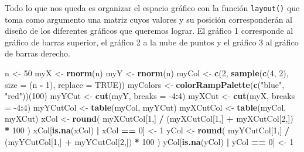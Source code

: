 \documentclass[
]{book}
\newenvironment{Shaded}{\begin{snugshade}}{\end{snugshade}}
\newcommand{\DataTypeTok}[1]{\textcolor[rgb]{0.13,0.29,0.53}{#1}}
\newcommand{\DecValTok}[1]{\textcolor[rgb]{0.00,0.00,0.81}{#1}}
\newcommand{\KeywordTok}[1]{\textcolor[rgb]{0.13,0.29,0.53}{\textbf{#1}}}
\newcommand{\NormalTok}[1]{#1}
\newcommand{\OperatorTok}[1]{\textcolor[rgb]{0.81,0.36,0.00}{\textbf{#1}}}
\newcommand{\OtherTok}[1]{\textcolor[rgb]{0.56,0.35,0.01}{#1}}
\newcommand{\StringTok}[1]{\textcolor[rgb]{0.31,0.60,0.02}{#1}}
\begin{document}
Todo lo que nos queda es organizar el espacio gráfico con la función \texttt{layout()} que toma como argumento una matriz cuyos valores y su posición corresponderán al diseño de los diferentes gráficos que queremos lograr. El gráfico 1 corresponde al gráfico de barras superior, el gráfico 2 a la nube de puntos y el gráfico 3 al gráfico de barras derecho.

\begin{Shaded}
\begin{Highlighting}[]
\NormalTok{n <-}\StringTok{ }\DecValTok{50}
\NormalTok{myX <-}\StringTok{ }\KeywordTok{rnorm}\NormalTok{(n)}
\NormalTok{myY <-}\StringTok{ }\KeywordTok{rnorm}\NormalTok{(n)}
\NormalTok{myCol <-}\StringTok{ }\KeywordTok{c}\NormalTok{(}\DecValTok{2}\NormalTok{, }\KeywordTok{sample}\NormalTok{(}\KeywordTok{c}\NormalTok{(}\DecValTok{4}\NormalTok{, }\DecValTok{2}\NormalTok{), }\DataTypeTok{size =}\NormalTok{ (n }\OperatorTok{-}\StringTok{ }\DecValTok{1}\NormalTok{), }\DataTypeTok{replace =} \OtherTok{TRUE}\NormalTok{))}
\NormalTok{myColors <-}\StringTok{ }\KeywordTok{colorRampPalette}\NormalTok{(}\KeywordTok{c}\NormalTok{(}\StringTok{"blue"}\NormalTok{, }\StringTok{"red"}\NormalTok{))(}\DecValTok{100}\NormalTok{)}
\NormalTok{myYCut <-}\StringTok{ }\KeywordTok{cut}\NormalTok{(myY, }\DataTypeTok{breaks =} \DecValTok{-4}\OperatorTok{:}\DecValTok{4}\NormalTok{)}
\NormalTok{myXCut <-}\StringTok{ }\KeywordTok{cut}\NormalTok{(myX, }\DataTypeTok{breaks =} \DecValTok{-4}\OperatorTok{:}\DecValTok{4}\NormalTok{)}
\NormalTok{myYCutCol <-}\StringTok{ }\KeywordTok{table}\NormalTok{(myCol, myYCut)}
\NormalTok{myXCutCol <-}\StringTok{ }\KeywordTok{table}\NormalTok{(myCol, myXCut)}
\NormalTok{xCol <-}\StringTok{ }\KeywordTok{round}\NormalTok{(}
\NormalTok{  myXCutCol[}\DecValTok{1}\NormalTok{,] }\OperatorTok{/}\StringTok{ }\NormalTok{(myXCutCol[}\DecValTok{1}\NormalTok{,] }\OperatorTok{+}\StringTok{ }\NormalTok{myXCutCol[}\DecValTok{2}\NormalTok{,]) }\OperatorTok{*}\StringTok{ }\DecValTok{100}
\NormalTok{)}
\NormalTok{xCol[}\KeywordTok{is.na}\NormalTok{(xCol) }\OperatorTok{|}\StringTok{ }\NormalTok{xCol }\OperatorTok{==}\StringTok{ }\DecValTok{0}\NormalTok{] <-}\StringTok{ }\DecValTok{1}
\NormalTok{yCol <-}\StringTok{ }\KeywordTok{round}\NormalTok{(}
\NormalTok{  myYCutCol[}\DecValTok{1}\NormalTok{,] }\OperatorTok{/}\StringTok{ }\NormalTok{(myYCutCol[}\DecValTok{1}\NormalTok{,] }\OperatorTok{+}\StringTok{ }\NormalTok{myYCutCol[}\DecValTok{2}\NormalTok{,]) }\OperatorTok{*}\StringTok{ }\DecValTok{100}
\NormalTok{)}
\NormalTok{yCol[}\KeywordTok{is.na}\NormalTok{(yCol) }\OperatorTok{|}\StringTok{ }\NormalTok{yCol }\OperatorTok{==}\StringTok{ }\DecValTok{0}\NormalTok{] <-}\StringTok{ }\DecValTok{1}

\end{Highlighting}
\end{Shaded}
\end{document}
